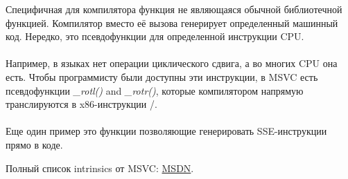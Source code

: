 \label{sec:compiler_intrinsic}

Специфичная для компилятора функция не являющаяся обычной библиотечной функцией.
Компилятор вместо её вызова генерирует определенный машинный код.
Нередко, это псевдофункции для определенной инструкции \ac{CPU}. \\
\\
Например, в языках \CCpp нет операции циклического сдвига, а во многих \ac{CPU} она есть.
Чтобы программисту были доступны эти инструкции, в MSVC есть псевдофункции 
\emph{\_rotl()} and \emph{\_rotr()}\FNMSDNROTxURL{},
которые компилятором напрямую транслируются в x86-инструкции /. \\
\\
Еще один пример это функции позволяющие генерировать SSE-инструкции прямо в коде.

Полный список intrinsics от MSVC: \href{http://go.yurichev.com/17254}{MSDN}.


